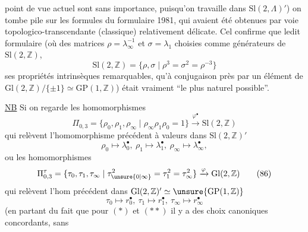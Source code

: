 point de vue actuel sont sans importance, puisqu'on travaille dans $\mathrm{Sl}(2,\Lambda)'$) on tombe pile sur les formules du formulaire 1981, qui avaient été obtenues par voie topologico-transcendante (classique) relativement délicate. Cel confirme que ledit formulaire (où  des matrices $\rho=\lambda_\infty^{-1}$ et $\sigma=\lambda_1$ choisies comme générateurs de $\mathrm{Sl}(2,\mathbb Z)$, 
\[
\mathrm{Sl}(2,\mathbb Z)=\{\rho,\sigma\mid\rho^3=\sigma^2=\rho^{-3}\}\tag*{(84)}
\]
 ses propriétés intrinsèques remarquables, qu'à conjugaison près par un élément de $\mathrm{Gl}(2,\mathbb Z)/\{\pm1\}\simeq\mathrm{GP}(1,\mathbb Z)$) était vraiment ``le plus naturel possible''.

\uline{NB} Si on regarde les homomorphismes
\[
\Pi_{0,3}=\{\rho_0,\rho_1,\rho_\infty\mid\rho_\infty\rho_1\rho_0=1\}\xrightarrow{\varphi^\bullet}\mathrm{Sl}(2,\mathbb Z)\tag*{(85)}
\]
qui relèvent l'homomorphisme précédent à valeurs dans $\mathrm{Sl}(2,\mathbb Z)'$
\[
\rho_0\mapsto\lambda_0^\bullet,\ \rho_1\mapsto\lambda_1^\bullet,\ \rho_\infty\mapsto\lambda_\infty^\bullet,\tag*{(*)}
\]
ou les homomorphismes
\[
\Pi_{0,3}^{\tau}=\{\tau_0,\tau_1,\tau_\infty\mid\tau_{\unsure{0|\infty}}^2=\tau_1^2=\tau_\infty^2\}\xrightarrow{\varphi}\mathrm{Gl}(2,\mathbb Z)\tag*{(86)}
\]
qui relèvent l'hom précédent dans $\mathrm{Gl}(2,\mathbb Z)'\simeq\unsure{\mathrm{GP}(1,\mathbb Z)}$
\[
\tau_0\mapsto r_0^\bullet,\ \tau_1\mapsto r_1^\bullet,\ \tau_\infty\mapsto r_\infty^\bullet\tag*{(**)}
\]
(en partant du fait que pour $(*)$ et $(**)$ il y a des choix canoniques concordants, sans 
